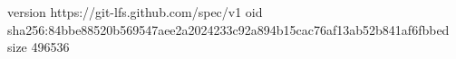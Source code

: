 version https://git-lfs.github.com/spec/v1
oid sha256:84bbe88520b569547aee2a2024233c92a894b15cac76af13ab52b841af6fbbed
size 496536
